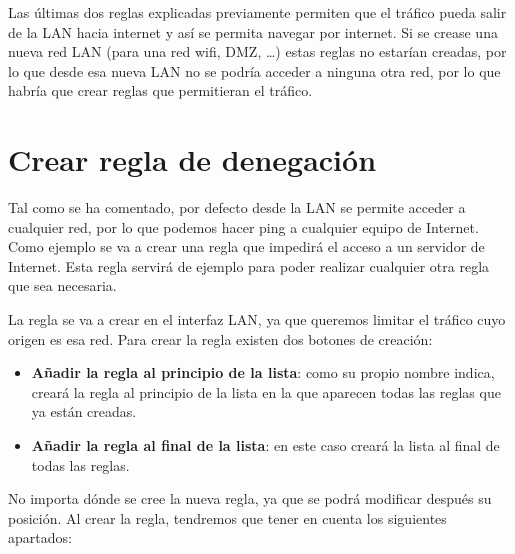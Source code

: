 Las últimas dos reglas explicadas previamente permiten que el tráfico pueda salir de la LAN hacia internet y así se permita navegar por internet. Si se crease una nueva red LAN (para una red wifi, DMZ, …) estas reglas no estarían creadas, por lo que desde esa nueva LAN no se podría acceder a ninguna otra red, por lo que habría que crear reglas que permitieran el tráfico.

\section{Crear regla de denegación}
Tal como se ha comentado, por defecto desde la LAN se permite acceder a cualquier red, por lo que podemos hacer ping a cualquier equipo de Internet. Como ejemplo se va a crear una regla que impedirá el acceso a un servidor de Internet. Esta regla servirá de ejemplo para poder realizar cualquier otra regla que sea necesaria.

La regla se va a crear en el interfaz LAN, ya que queremos limitar el tráfico cuyo origen es esa red. Para crear la regla existen dos botones de creación:

\begin{itemize}
    \item \textbf{Añadir la regla al principio de la lista}: como su propio nombre indica, creará la regla al principio de la lista en la que aparecen todas las reglas que ya están creadas.
    \item \textbf{Añadir la regla al final de la lista}: en este caso creará la lista al final de todas las reglas.
\end{itemize}

No importa dónde se cree la nueva regla, ya que se podrá modificar después su posición. Al crear la regla, tendremos que tener en cuenta los siguientes apartados:

